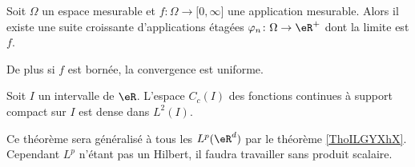\begin{lemma}      \label{LempTBaUw}
    Soit \( \Omega\) un espace mesurable et \( f\colon \Omega\to \mathopen[ 0 , \infty \mathclose]\) une application mesurable. Alors il existe une suite croissante d'applications étagées \( \varphi_n\colon \Omega\to \eR^+\) dont la limite est \( f\).

    De plus si \( f\) est bornée, la convergence est uniforme.
\end{lemma}

\begin{theorem}       \label{ThoJsBKir}
    Soit \( I\) un intervalle de \( \eR\). L'espace \( C_c(I)\) des fonctions continues à support compact sur \( I\) est dense dans \( L^2(I)\).
\end{theorem}
Ce théorème sera généralisé à tous les \( L^p(\eR^d)\) par le théorème \ref{ThoILGYXhX}. Cependant \( L^p\) n'étant pas un Hilbert, il faudra travailler sans produit scalaire.

